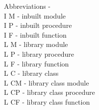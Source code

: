 \pagebreak

Abbreviations - \\
I M - inbuilt module \\
I P - inbuilt procedure \\
I F - inbuilt function \\
L M - library module \\
L P - library procedure \\
L F - library function \\
L C - library class \\
L CM - library class module\\
L CP - library class procedure\\
L CF - library class function\\



\pagebreak

